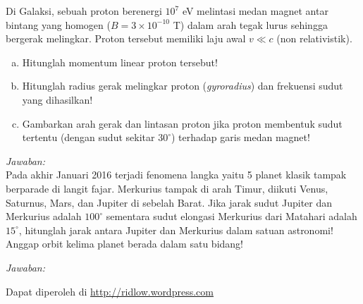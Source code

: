 \documentclass[11pt,fleqn, a4paper]{exam}
\begin{document}
\begin{questions}
\vspace{0.5cm}
\question Di Galaksi, sebuah proton berenergi $10^7$ eV melintasi medan magnet antar bintang yang homogen ($B = 3 \times 10^{-10}$ T) dalam arah tegak lurus sehingga bergerak melingkar. Proton tersebut memiliki laju awal $v \ll c$ (non relativistik).
\begin{enumerate}[(a)]
\item Hitunglah momentum linear proton tersebut!
\item Hitunglah radius gerak melingkar proton (\textit{gyroradius}) dan frekuensi sudut yang dihasilkan!
\item Gambarkan arah gerak dan lintasan proton jika proton membentuk sudut tertentu (dengan sudut sekitar $30^{\circ}$) terhadap garis medan magnet!
\end{enumerate}

\textit{Jawaban: }\\


\vspace{0.5cm}
\question Pada akhir Januari 2016 terjadi fenomena langka yaitu 5 planet klasik tampak berparade di langit fajar. Merkurius tampak di arah Timur, diikuti Venus, Saturnus, Mars, dan Jupiter di sebelah Barat. Jika jarak sudut Jupiter dan Merkurius adalah $100^{\circ}$ sementara sudut elongasi Merkurius dari Matahari adalah $15^{\circ}$, hitunglah jarak antara Jupiter dan Merkurius dalam satuan astronomi! Anggap orbit kelima planet berada dalam satu bidang!

\textit{Jawaban: }\\



\end{questions}

\vspace{1cm}
\begin{flushright}
Dapat diperoleh di \href{http://ridlow.wordpress.com}{http://ridlow.wordpress.com}
\end{flushright}
\end{document}
